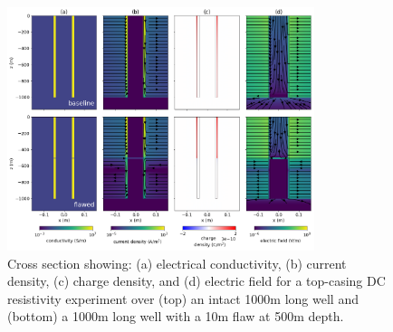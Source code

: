 \begin{figure}
    \begin{center}
    \includegraphics[width=0.8\textwidth]{figures/dc_casing/casing_integrity_basics.png}
    \end{center}
\caption{
    Cross section showing: (a) electrical conductivity, (b) current density, (c) charge density, and (d) electric field
    for a top-casing DC resistivity experiment over (top) an intact 1000m long well and (bottom) a 1000m long well
    with a 10m flaw at 500m depth.
}
\label{fig:casing_integrity_basics}
\end{figure}
